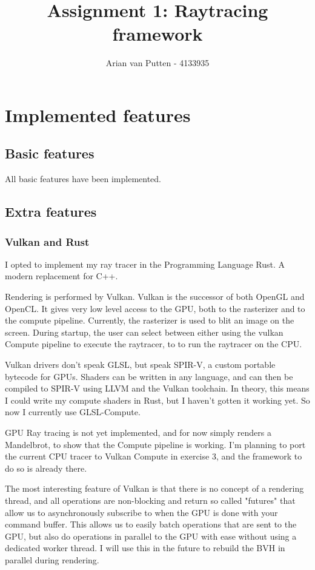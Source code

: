 \documentclass{article}
\title{Assignment 1: Raytracing framework}
\author{Arian van Putten - 4133935}
\begin{document}
\maketitle

\section{Implemented features}
\subsection{Basic features}
All basic features have been implemented.

\subsection{Extra features}

\subsubsection{Vulkan and Rust}
I opted to implement my ray tracer in the Programming Language Rust. A modern replacement for C++.

Rendering is performed by Vulkan. Vulkan is the successor of both OpenGL
  and OpenCL. It gives very low level access to the GPU, both to the rasterizer
    and to the compute pipeline.  Currently, the rasterizer is used to blit an
    image on the screen.  During startup, the user can select between either
    using the vulkan Compute pipeline to execute the raytracer, to to run the
    raytracer on the CPU.

    Vulkan drivers don't speak GLSL, but speak SPIR-V, a custom portable
    bytecode for GPUs.  Shaders can be written in any language, and can then be
    compiled to SPIR-V using LLVM and the Vulkan toolchain. In theory, this
    means I could write my compute shaders in Rust, but I haven't gotten it
    working yet.  So now I currently use GLSL-Compute.

    GPU Ray tracing is not yet implemented, and for now simply renders a
    Mandelbrot, to show that the Compute pipeline is working. I'm planning to
    port the current CPU tracer to Vulkan Compute in exercise 3, and the
    framework to do so is already there.

    The most interesting feature of Vulkan is that there is no concept of a
    rendering thread, and all operations are non-blocking and return so called
    "futures" that allow us to asynchronously subscribe to when the GPU is done
    with your command buffer.  This allows us to easily batch operations that
    are sent to the GPU, but also do operations in parallel to the GPU with
    ease without using a dedicated worker thread. I will use this in the future
    to rebuild the BVH in parallel during rendering.
\end{document}
